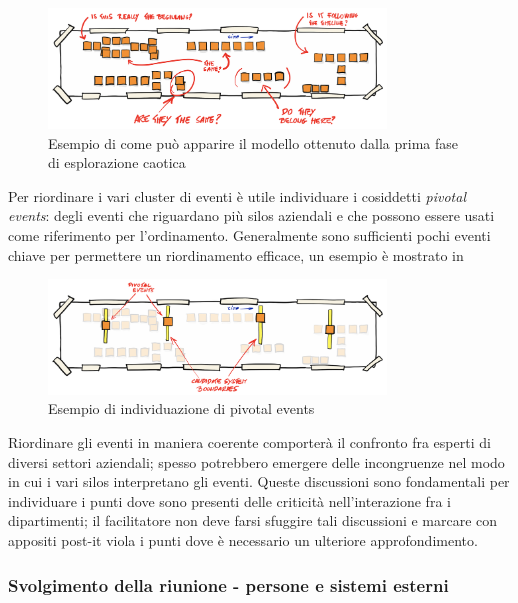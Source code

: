 \begin{figure}[!ht]
  \centering
  \includegraphics[width=0.8\textwidth]{images/event-storming-exploration.png}
  \caption{Esempio di come può apparire il modello ottenuto dalla prima fase di esplorazione caotica}
  \label{fig:event-storming-exploration}
\end{figure}

Per riordinare i vari cluster di eventi è utile individuare i cosiddetti \emph{pivotal events}: degli eventi che riguardano più silos aziendali e che possono essere usati come riferimento per l'ordinamento. Generalmente sono sufficienti pochi eventi chiave per permettere un riordinamento efficace, un esempio è mostrato in 

\begin{figure}[!ht]
  \centering
  \includegraphics[width=0.8\textwidth]{images/event-storming-pivotal-events.png}
  \caption{Esempio di individuazione di pivotal events}
  \label{fig:event-storming-pivotal-events}
\end{figure}

Riordinare gli eventi in maniera coerente comporterà il confronto fra esperti di diversi settori aziendali; spesso potrebbero emergere delle incongruenze nel modo in cui i vari silos interpretano gli eventi. Queste discussioni sono fondamentali per individuare i punti dove sono presenti delle criticità nell'interazione fra i dipartimenti; il facilitatore non deve farsi sfuggire tali discussioni e marcare con appositi post-it viola i punti dove è necessario un ulteriore approfondimento.

\subsubsection{Svolgimento della riunione - persone e sistemi esterni}
\label{sec:svolgimento-della-riunione-persone-e-sistemi-esterni}

